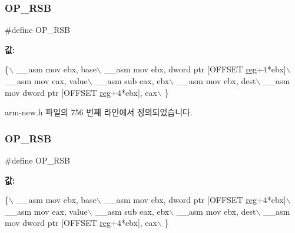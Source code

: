 \subsubsection{\texorpdfstring{O\+P\+\_\+\+R\+SB}{OP\_RSB}\hspace{0.1cm}{\footnotesize\ttfamily [1/2]}}
{\footnotesize\ttfamily \#define O\+P\+\_\+\+R\+SB}

{\bfseries 값\+:}
\begin{DoxyCode}
\{\(\backslash\)
        \_\_asm mov ebx, base\(\backslash\)
        \_\_asm mov ebx, dword ptr [OFFSET \mbox{\hyperlink{_g_b_a_8h_ae29faba89509024ffd1a292badcedf2d}{reg}}+4*ebx]\(\backslash\)
        \_\_asm mov eax, value\(\backslash\)
        \_\_asm sub eax, ebx\(\backslash\)
        \_\_asm mov ebx, dest\(\backslash\)
        \_\_asm mov dword ptr [OFFSET \mbox{\hyperlink{_g_b_a_8h_ae29faba89509024ffd1a292badcedf2d}{reg}}+4*ebx], eax\(\backslash\)
      \}
\end{DoxyCode}


arm-\/new.\+h 파일의 756 번째 라인에서 정의되었습니다.

\mbox{\label{_g_b_a_8cpp_adf32c701a0a978533f69ce934229356b}} 
\subsubsection{\texorpdfstring{O\+P\+\_\+\+R\+SB}{OP\_RSB}\hspace{0.1cm}{\footnotesize\ttfamily [2/2]}}
{\footnotesize\ttfamily \#define O\+P\+\_\+\+R\+SB}

{\bfseries 값\+:}
\begin{DoxyCode}
\{\(\backslash\)
        \_\_asm mov ebx, base\(\backslash\)
        \_\_asm mov ebx, dword ptr [OFFSET \mbox{\hyperlink{_g_b_a_8h_ae29faba89509024ffd1a292badcedf2d}{reg}}+4*ebx]\(\backslash\)
        \_\_asm mov eax, value\(\backslash\)
        \_\_asm sub eax, ebx\(\backslash\)
        \_\_asm mov ebx, dest\(\backslash\)
        \_\_asm mov dword ptr [OFFSET \mbox{\hyperlink{_g_b_a_8h_ae29faba89509024ffd1a292badcedf2d}{reg}}+4*ebx], eax\(\backslash\)
      \}
\end{DoxyCode}
\mbox{\label{arm-new_8h_abe9b27e4c5be88069b41e0a7c9ccb342}} 
